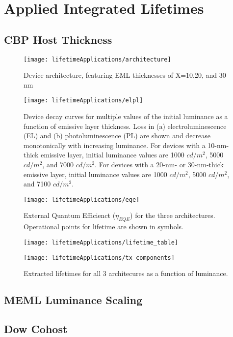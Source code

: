 \documentclass[../thesis.tex]{subfiles}
\begin{document}
\section{Applied Integrated Lifetimes}

\subsection{CBP Host Thickness}

\begin{figure}[ht]
\centering
\texttt{[image: lifetimeApplications/architecture]}
\caption{Device architecture, featuring EML thicknesses of X=10,20, and 30 nm}
\label{fig:architecture}
\end{figure}

\begin{figure}[ht]
\centering
\texttt{[image: lifetimeApplications/elpl]}
\caption{Device decay curves for multiple values of the initial luminance as a function of emissive layer thickness.  Loss in (a) electroluminescence (EL) and (b) photoluminescence (PL) are shown and decrease monotonically with increasing luminance.  For devices with a 10-nm-thick emissive layer, initial luminance values are 1000 $cd/m^2$, 5000 $cd/m^2$, and 7000 $cd/m^2$.  For devices with a 20-nm- or 30-nm-thick emissive layer, initial luminance values are 1000 $cd/m^2$, 5000 $cd/m^2$, and 7100 $cd/m^2$. }
\label{fig:elpl}
\end{figure}

\begin{figure}[ht]
\centering
\texttt{[image: lifetimeApplications/eqe]}
\caption{External Quantum Efficienct ($\eta_{EQE}$) for the three architectures.  Operational points for lifetime are shown in symbols.}
\label{fig:eqe}
\end{figure}

\begin{figure}[ht]
\centering
\texttt{[image: lifetimeApplications/lifetime\_table]}
\label{fig:lifetime_table}
\end{figure}

\begin{figure}[ht]
\centering
\texttt{[image: lifetimeApplications/tx\_components]}
\caption{Extracted lifetimes for all 3 architecures as a function of luminance.}
\label{fig:tx_components}
\end{figure}

\subsection{MEML Luminance Scaling}


\subsection{Dow Cohost}



\end{document}
